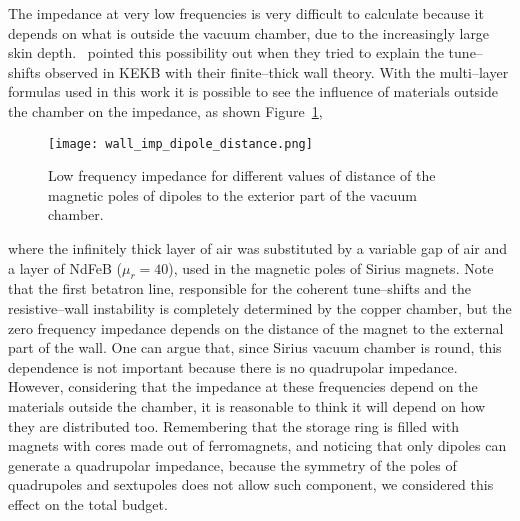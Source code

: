    The impedance at very low frequencies is very difficult to calculate because it depends on what is outside the vacuum chamber, due to the increasingly large skin depth.~ pointed this possibility out when they tried to explain the tune--shifts observed in KEKB with their finite--thick wall theory. With the multi--layer formulas used in this work it is possible to see the influence of materials outside the chamber on the impedance, as shown Figure~\ref{fig:wall_imp_dipole_distance},
    \begin{figure}
        \centering
        \texttt{[image: wall\_imp\_dipole\_distance.png]}
        \caption{Low frequency impedance for different values of distance of the magnetic poles of dipoles to the exterior part of the vacuum chamber.}
        \label{fig:wall_imp_dipole_distance}
    \end{figure}
    where the infinitely thick layer of air was substituted by a variable gap of air and a layer of NdFeB ($\mu_r=40$), used in the magnetic poles of Sirius magnets. Note that the first betatron line, responsible for the coherent tune--shifts and the resistive--wall instability is completely determined by the copper chamber, but the zero frequency impedance depends on the distance of the magnet to the external part of the wall. One can argue that, since Sirius vacuum chamber is round, this dependence is not important because there is no quadrupolar impedance. However, considering that the impedance at these frequencies depend on the materials outside the chamber, it is reasonable to think it will depend on how they are distributed too. Remembering that the storage ring is filled with magnets with cores made out of ferromagnets, and noticing that only dipoles can generate a quadrupolar impedance, because the symmetry of the poles of quadrupoles and sextupoles does not allow such component, we considered this effect on the total budget.

